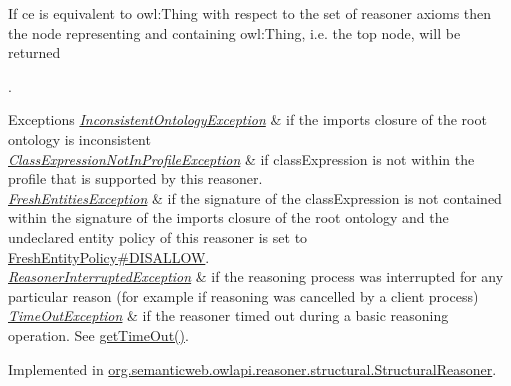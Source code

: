 If {\ttfamily ce} is equivalent to {\ttfamily owl\-:Thing} with respect to the set of reasoner axioms then the node representing and containing {\ttfamily owl\-:Thing}, i.\-e. the top node, will be returned 

.


\begin{DoxyExceptions}{Exceptions}
{\em \hyperlink{classorg_1_1semanticweb_1_1owlapi_1_1reasoner_1_1_inconsistent_ontology_exception}{Inconsistent\-Ontology\-Exception}} & if the imports closure of the root ontology is inconsistent \\
\hline
{\em \hyperlink{classorg_1_1semanticweb_1_1owlapi_1_1reasoner_1_1_class_expression_not_in_profile_exception}{Class\-Expression\-Not\-In\-Profile\-Exception}} & if {\ttfamily class\-Expression} is not within the profile that is supported by this reasoner. \\
\hline
{\em \hyperlink{classorg_1_1semanticweb_1_1owlapi_1_1reasoner_1_1_fresh_entities_exception}{Fresh\-Entities\-Exception}} & if the signature of the class\-Expression is not contained within the signature of the imports closure of the root ontology and the undeclared entity policy of this reasoner is set to \hyperlink{enumorg_1_1semanticweb_1_1owlapi_1_1reasoner_1_1_fresh_entity_policy_a762eae6d5b2449d125311ecaabfdc8d0}{Fresh\-Entity\-Policy\#\-D\-I\-S\-A\-L\-L\-O\-W}. \\
\hline
{\em \hyperlink{classorg_1_1semanticweb_1_1owlapi_1_1reasoner_1_1_reasoner_interrupted_exception}{Reasoner\-Interrupted\-Exception}} & if the reasoning process was interrupted for any particular reason (for example if reasoning was cancelled by a client process) \\
\hline
{\em \hyperlink{classorg_1_1semanticweb_1_1owlapi_1_1reasoner_1_1_time_out_exception}{Time\-Out\-Exception}} & if the reasoner timed out during a basic reasoning operation. See \hyperlink{interfaceorg_1_1semanticweb_1_1owlapi_1_1reasoner_1_1_o_w_l_reasoner_a44b2c968f989afe5290db29c90faa164}{get\-Time\-Out()}. \\
\hline
\end{DoxyExceptions}


Implemented in \hyperlink{classorg_1_1semanticweb_1_1owlapi_1_1reasoner_1_1structural_1_1_structural_reasoner_a41065ed19078e0e25c35153c2a22b53e}{org.\-semanticweb.\-owlapi.\-reasoner.\-structural.\-Structural\-Reasoner}.

